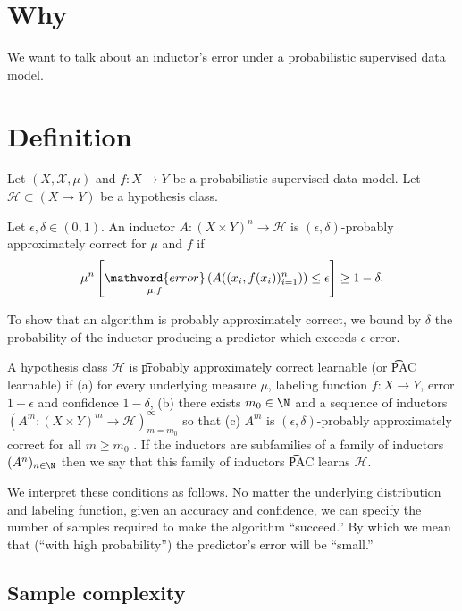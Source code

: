 

\section*{Why}

We want to talk about an inductor's error under a probabilistic supervised data model.

\section*{Definition}

Let $(X, \mathcal{X} , \mu )$ and $f: X \to Y$ be a probabilistic supervised data model.
Let $\mathcal{H}  \subset (X \to Y)$ be a hypothesis class.

Let $\epsilon ,\delta  \in (0, 1)$.
An inductor $A: (X \times  Y)^n \to \mathcal{H} $ is \t{$(\epsilon ,\delta )$-probably approximately correct} for $\mu $ and $f$ if
\[
\mu ^{n}\left[
\underset{\mu , f}{\mathword{error}}\left(
A((x_i, f(x_i))_{i = 1}^{n})
\right) \leq \epsilon
\right] \geq 1 - \delta .
\]

To show that an algorithm is probably approximately correct, we bound by $\delta $ the probability of the inductor producing a predictor which exceeds $\epsilon $ error.

A hypothesis class $\mathcal{H} $ is \t{probably approximately correct learnable} (or \t{PAC learnable}) if
(a) for every underlying measure $\mu $, labeling function $f: X \to Y$, error $1-\epsilon $ and confidence $1-\delta $, (b) there exists $m_0 \in \N  $ and a sequence of inductors $(A^m: (X \times Y)^{m} \to \mathcal{H} )_{m = m_0}^{\infty}$ so that (c) $A^m$ is $(\epsilon , \delta )$-probably approximately correct for all $m \geq m_0$ .
If the inductors are subfamilies of a family of inductors $(A^n)_{n \in \N  }$ then we say that this family of inductors \t{PAC learns} $\mathcal{H} $.

We interpret these conditions as follows.
No matter the underlying distribution and labeling function, given an accuracy and confidence, we can specify the number of samples required to make the algorithm ``succeed.''
By which we mean that (``with high probability'') the predictor's error will be ``small.''

\subsection*{Sample complexity}


